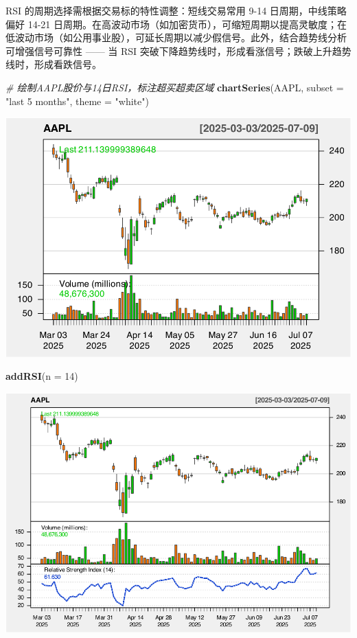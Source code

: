 \documentclass[]{ctexbook}
\newenvironment{Shaded}{\begin{snugshade}}{\end{snugshade}}
\newcommand{\AttributeTok}[1]{\textcolor[rgb]{0.13,0.29,0.53}{#1}}
\newcommand{\CommentTok}[1]{\textcolor[rgb]{0.56,0.35,0.01}{\textit{#1}}}
\newcommand{\DecValTok}[1]{\textcolor[rgb]{0.00,0.00,0.81}{#1}}
\newcommand{\FunctionTok}[1]{\textcolor[rgb]{0.13,0.29,0.53}{\textbf{#1}}}
\newcommand{\NormalTok}[1]{#1}
\newcommand{\StringTok}[1]{\textcolor[rgb]{0.31,0.60,0.02}{#1}}
\begin{document}
RSI 的周期选择需根据交易标的特性调整：短线交易常用 9-14 日周期，中线策略偏好 14-21 日周期。在高波动市场（如加密货币），可缩短周期以提高灵敏度；在低波动市场（如公用事业股），可延长周期以减少假信号。此外，结合趋势线分析可增强信号可靠性 ------ 当 RSI 突破下降趋势线时，形成看涨信号；跌破上升趋势线时，形成看跌信号。

\begin{Shaded}
\begin{Highlighting}[]
\CommentTok{\# 绘制AAPL股价与14日RSI，标注超买超卖区域}
\FunctionTok{chartSeries}\NormalTok{(AAPL, }\AttributeTok{subset =} \StringTok{"last 5 months"}\NormalTok{, }\AttributeTok{theme =} \StringTok{"white"}\NormalTok{)}
\end{Highlighting}
\end{Shaded}

\includegraphics[width=0.9\linewidth]{quantmod_files/figure-latex/rsi-1}

\begin{Shaded}
\begin{Highlighting}[]
\FunctionTok{addRSI}\NormalTok{(}\AttributeTok{n =} \DecValTok{14}\NormalTok{)}
\end{Highlighting}
\end{Shaded}

\includegraphics[width=0.9\linewidth]{quantmod_files/figure-latex/rsi-2}
\end{document}
